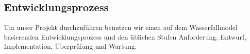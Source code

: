 \subsection{Entwicklungsprozess}
\label{sec:Entwicklungsprozess}

    Um unser Projekt durchzuführen benutzen wir einen auf dem Wasserfallmodel basierenden Entwicklungsprozess und den üblichen Stufen Anforderung, Entwurf, Implementation, Überprüfung und Wartung.
